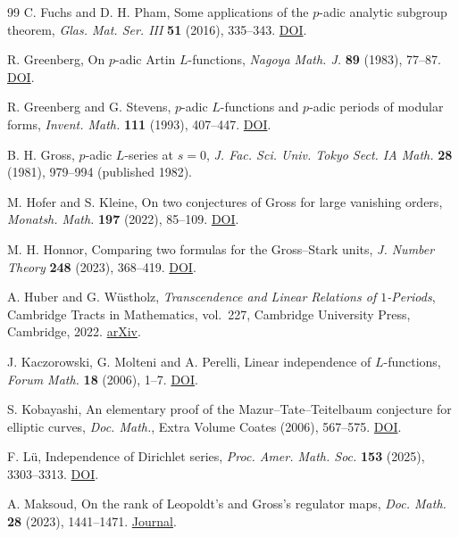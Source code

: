 \documentclass[11pt]{amsart}
\numberwithin{equation}{section}
\theoremstyle{definition}
\theoremstyle{remark}
\begin{document}
\begin{thebibliography}{99}
C. Fuchs and D. H. Pham,
Some applications of the $p$-adic analytic subgroup theorem,
\emph{Glas. Mat. Ser. III} \textbf{51} (2016), 335--343.
\href{https://doi.org/10.3336/gm.51.2.04}{DOI}.

R. Greenberg, On $p$-adic Artin $L$-functions,
\emph{Nagoya Math. J.} \textbf{89} (1983), 77--87.
\href{https://doi.org/10.1017/S0027763000020250}{DOI}.

R. Greenberg and G. Stevens, $p$-adic $L$-functions and $p$-adic
periods of modular forms, \emph{Invent. Math.} \textbf{111}
(1993), 407--447.
\href{https://doi.org/10.1007/BF01231294}{DOI}.

B. H. Gross, $p$-adic $L$-series at $s=0$,
\emph{J. Fac. Sci. Univ. Tokyo Sect. IA Math.}
\textbf{28} (1981), 979--994 (published 1982).

M. Hofer and S. Kleine, On two conjectures of Gross for large vanishing
orders, \emph{Monatsh. Math.} \textbf{197} (2022), 85--109.
\href{https://doi.org/10.1007/s00605-021-01555-3}{DOI}.

M. H. Honnor, Comparing two formulas for the Gross--Stark units,
\emph{J. Number Theory} \textbf{248} (2023), 368--419.
\href{https://doi.org/10.1016/j.jnt.2023.02.002}{DOI}.

A. Huber and G. W\"ustholz,
\emph{Transcendence and Linear Relations of $1$-Periods},
Cambridge Tracts in Mathematics, vol.~227,
Cambridge University Press, Cambridge, 2022.
\href{https://arxiv.org/abs/1805.10104}{arXiv}.

J. Kaczorowski, G. Molteni and A. Perelli, Linear independence of
$L$-functions, \emph{Forum Math.} \textbf{18} (2006), 1--7.
\href{https://doi.org/10.1515/FORUM.2006.001}{DOI}.

S. Kobayashi, An elementary proof of the Mazur--Tate--Teitelbaum
conjecture for elliptic curves, \emph{Doc. Math.}, Extra Volume
Coates (2006), 567--575.
\href{https://doi.org/10.4171/DMS/4/16}{DOI}.

F. L\"u, Independence of Dirichlet series,
\emph{Proc. Amer. Math. Soc.} \textbf{153} (2025), 3303--3313.
\href{https://doi.org/10.1090/proc/17276}{DOI}.

A. Maksoud, On the rank of Leopoldt's and Gross's regulator maps,
\emph{Doc. Math.} \textbf{28} (2023), 1441--1471.
\href{https://ems.press/content/serial-article-files/31139}{Journal}.


\end{thebibliography}
\end{document}
